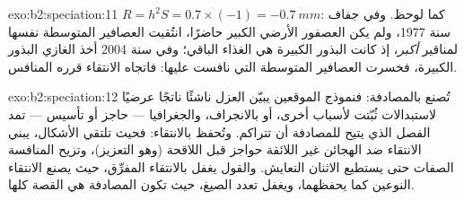 \begin{solution}{exo:b2:speciation:11}
$R = h^{2}S = 0.7\times(-1) = \qty{-0.7}{mm}$: كما لوحظ. وفي
جفاف سنة 1977، ولم يكن العصفور الأرضي الكبير حاضرًا، انتُقيت العصافير
المتوسطة نفسها لمناقير \emph{أكبر}، إذ كانت البذور الكبيرة
هي الغذاء الباقي؛ وفي سنة 2004 أخذ الغازي البذور الكبيرة،
فخسرت العصافير المتوسطة التي نافست عليها: فاتجاه
الانتقاء قرره المنافس.
\end{solution}

\begin{solution}{exo:b2:speciation:12}
تُصنع بالمصادفة: فنموذج الموقعين يبيّن العزل ناشئًا ناتجًا
عرضيًا لاستبدالات ثُبّتت لأسباب أخرى، أو بالانجراف،
والجغرافيا --- حاجز أو تأسيس --- تمد الفصل
الذي يتيح للمصادفة أن تتراكم. وتُحفظ بالانتقاء: فحيث تلتقي
الأشكال، يبني الانتقاء ضد الهجائن غير اللائقة حواجز قبل
اللاقحة (وهو التعزيز)، وتزيح المنافسة الصفات حتى
يستطيع الاثنان التعايش. والقول يغفل 
بالانتقاء المفرِّق، حيث يصنع الانتقاء النوعين كما يحفظهما،
ويغفل تعدد الصيغ، حيث تكون المصادفة هي القصة كلها.
\end{solution}

